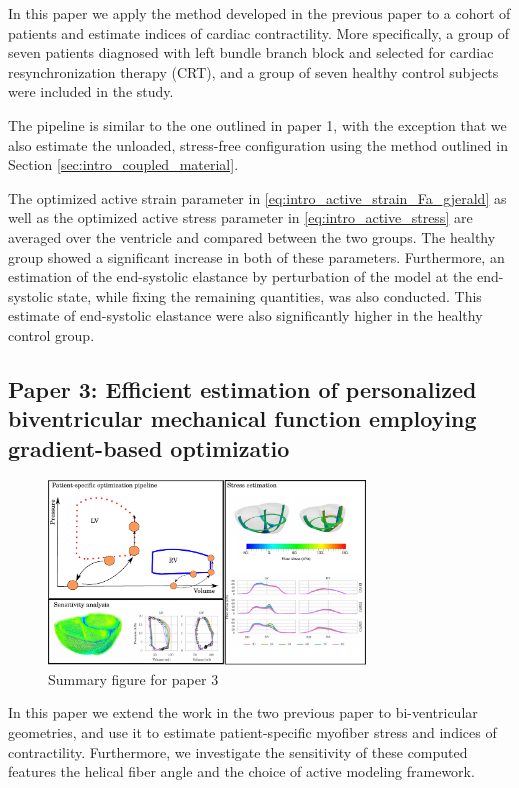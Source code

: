 In this paper we apply the method developed in the previous paper to a
cohort of patients and estimate indices of cardiac contractility. More
specifically, a group of seven patients diagnosed with left bundle branch block and
selected for cardiac resynchronization therapy (CRT), and a group of
seven healthy control subjects were included in the study.

The pipeline is similar to the one outlined in paper 1, with the
exception that we also estimate the unloaded, stress-free
configuration using the method outlined in Section
\ref{sec:intro_coupled_material}. 

The optimized active strain parameter in
\eqref{eq:intro_active_strain_Fa_gjerald} as well as the optimized
active stress parameter in \eqref{eq:intro_active_stress} are averaged
over the ventricle and compared between the two groups. The healthy
group showed a significant increase in both of these
parameters. Furthermore, an estimation of the end-systolic elastance by
perturbation of the model at the end-systolic state, while fixing
the remaining quantities, was also conducted. This estimate of end-systolic
elastance were also significantly higher in the healthy control
group. 


\subsection{Paper 3: Efficient estimation of personalized biventricular mechanical
  function employing gradient-based optimizatio}

\begin{figure}[htbp]
  \centering
    \includegraphics[width=0.75\textwidth]{chapters/introduction/figures/paper3}
\caption{Summary figure for paper 3}
\label{fig:paper3}
\end{figure}

In this paper we extend the work in the two previous paper to
bi-ventricular geometries, and use it to estimate patient-specific
myofiber stress and indices of contractility. Furthermore, we investigate
the sensitivity of these computed features the helical fiber angle and
the choice of active modeling framework.

